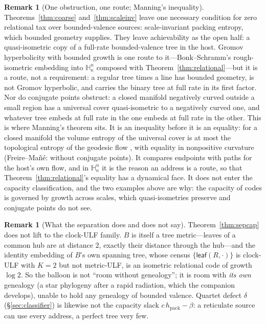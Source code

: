 \documentclass[11pt,reqno]{amsart}
\theoremstyle{plain}
\theoremstyle{definition}
\newtheorem{remark}[theorem]{Remark}
\newcommand{\hpack}{h_{\mathrm{pack}}}
\newcommand{\Hk}{\mathbb{H}^n_\kappa}
\begin{document}
\begin{remark}[One obstruction, one route; Manning's inequality]\label{rem:twogaps}
Theorems~\ref{thm:coarse} and~\ref{thm:scaleinv} leave one necessary condition for zero relational tax over bounded-valence sources: scale-invariant packing entropy, which bounded geometry supplies. They leave achievability as the open half: a quasi-isometric copy of a full-rate bounded-valence tree in the host. Gromov hyperbolicity with bounded growth is one route to it---Bonk--Schramm's rough-isometric embedding into $\Hk$ \cite{bonkschramm2000} composed with Theorem~\ref{thm:relational}---but it is a route, not a requirement: a regular tree times a line has bounded geometry, is not Gromov hyperbolic, and carries the binary tree at full rate in its first factor. Nor do conjugate points obstruct: a closed manifold negatively curved outside a small region has a universal cover quasi-isometric to a negatively curved one, and whatever tree embeds at full rate in the one embeds at full rate in the other. This is where Manning's theorem sits. It is an inequality before it is an equality: for a closed manifold the volume entropy of the universal cover is at most the topological entropy of the geodesic flow \cite{manning1979}, with equality in nonpositive curvature (Freire--Mañé: without conjugate points). It compares endpoints with paths for the host's own flow, and in $\Hk$ it is the reason an address is a route, so that Theorem~\ref{thm:relational}'s equality has a dynamical face. It does not enter the capacity classification, and the two examples above are why: the capacity of codes is governed by growth across scales, which quasi-isometries preserve and conjugate points do not see.
\end{remark}

\begin{remark}[What the separation does and does not say]\label{rem:balloon}
Theorem~\ref{thm:sepcap} does not lift to the clock-ULF family. $B$ is itself a tree metric---leaves of a common hub are at distance $2$, exactly their distance through the hub---and the identity embedding of $B$'s own spanning tree, whose census $\{\mathsf{leaf}(R,\cdot)\}$ is clock-ULF with $K=2$ but not metric-ULF, is an isometric relational code of growth $\log2$. So the balloon is not ``room without genealogy''; it is room with \emph{its own} genealogy (a star phylogeny after a rapid radiation, which the companion develops), unable to hold any genealogy of bounded valence. Quartet defect $\delta$ (\S\ref{sec:classifier}) is likewise not the capacity slack $c\,\hpack-\beta$: a reticulate source can use every address, a perfect tree very few.
\end{remark}
\end{document}
